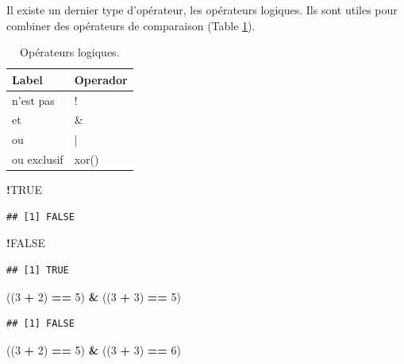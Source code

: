\documentclass[]{book}
\newenvironment{Shaded}{\begin{snugshade}}{\end{snugshade}}
\newcommand{\DecValTok}[1]{\textcolor[rgb]{0.00,0.00,0.81}{#1}}
\newcommand{\StringTok}[1]{\textcolor[rgb]{0.31,0.60,0.02}{#1}}
\newcommand{\OtherTok}[1]{\textcolor[rgb]{0.56,0.35,0.01}{#1}}
\newcommand{\OperatorTok}[1]{\textcolor[rgb]{0.81,0.36,0.00}{\textbf{#1}}}
\newcommand{\NormalTok}[1]{#1}
\begin{document}
Il existe un dernier type d'opérateur, les opérateurs logiques. Ils sont
utiles pour combiner des opérateurs de comparaison (Table
\ref{tab:tabOpLog}).

\begin{table}

\caption{\label{tab:tabOpLog}Opérateurs logiques.\label{tab:tabOpLog}}
\centering
\begin{tabular}[t]{l|l}
\hline
Label & Operador\\
\hline
n'est pas & !\\
\hline
et & \&\\
\hline
ou & |\\
\hline
ou exclusif & xor()\\
\hline
\end{tabular}
\end{table}

\begin{Shaded}
\begin{Highlighting}[]
\OperatorTok{!}\OtherTok{TRUE}
\end{Highlighting}
\end{Shaded}

\begin{verbatim}
## [1] FALSE
\end{verbatim}

\begin{Shaded}
\begin{Highlighting}[]
\OperatorTok{!}\OtherTok{FALSE}
\end{Highlighting}
\end{Shaded}

\begin{verbatim}
## [1] TRUE
\end{verbatim}

\begin{Shaded}
\begin{Highlighting}[]
\NormalTok{((}\DecValTok{3} \OperatorTok{+}\StringTok{ }\DecValTok{2}\NormalTok{) }\OperatorTok{==}\StringTok{ }\DecValTok{5}\NormalTok{) }\OperatorTok{&}\StringTok{ }\NormalTok{((}\DecValTok{3} \OperatorTok{+}\StringTok{ }\DecValTok{3}\NormalTok{) }\OperatorTok{==}\StringTok{ }\DecValTok{5}\NormalTok{)}
\end{Highlighting}
\end{Shaded}

\begin{verbatim}
## [1] FALSE
\end{verbatim}

\begin{Shaded}
\begin{Highlighting}[]
\NormalTok{((}\DecValTok{3} \OperatorTok{+}\StringTok{ }\DecValTok{2}\NormalTok{) }\OperatorTok{==}\StringTok{ }\DecValTok{5}\NormalTok{) }\OperatorTok{&}\StringTok{ }\NormalTok{((}\DecValTok{3} \OperatorTok{+}\StringTok{ }\DecValTok{3}\NormalTok{) }\OperatorTok{==}\StringTok{ }\DecValTok{6}\NormalTok{)}
\end{Highlighting}
\end{Shaded}
\end{document}
